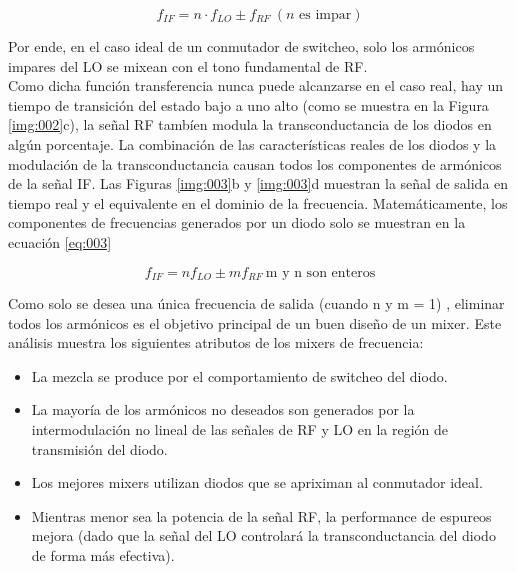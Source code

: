 \documentclass[a4paper,10pt]{article}
\begin{document}
	\begin{equation*}
		f_{IF} = n\cdot f_{LO}\pm f_{RF}~(n\text{ es impar})
	\end{equation*}

	\indent Por ende, en el caso ideal de un conmutador de switcheo, solo los 
	armónicos impares del LO se mixean con el tono fundamental de RF. \\
	\indent Como dicha función transferencia nunca puede alcanzarse en el caso 
	real, hay un tiempo de transición del estado bajo a uno alto (como se 
	muestra en la Figura \ref{img:002}c), la señal RF tambíen modula la 
	transconductancia de los diodos en algún porcentaje. La combinación de las 
	características reales de los diodos y la modulación de la transconductancia
	causan todos los componentes de armónicos de la señal IF. Las Figuras 
	\ref{img:003}b y \ref{img:003}d muestran la señal de salida en tiempo real y
	el equivalente en el dominio de la frecuencia. Matemáticamente, los 
	componentes de frecuencias generados por un diodo solo se muestran en la 
	ecuación \ref{eq:003}

	\begin{equation}\label{eq:003}
 		f_{IF} = n f_{LO}\pm m f_{RF}~\text{m y n son enteros}
	\end{equation}

	\indent Como solo se desea una única frecuencia de salida (cuando n y m = 1)
	, eliminar todos los armónicos es el objetivo principal de un buen diseño 
	de un mixer. Este análisis muestra los siguientes atributos de los mixers de
	frecuencia:

	\begin{itemize}
		\item La mezcla se produce por el comportamiento de switcheo del diodo.
		\item La mayoría de los armónicos no deseados son generados por la 
		intermodulación no lineal de las señales de RF y LO en la región de 
		transmisión del diodo.
		\item Los mejores mixers utilizan diodos que se apriximan al conmutador 
		ideal.
		\item Mientras menor sea la potencia de la señal RF, la performance de 
		espureos mejora (dado que la señal del LO controlará la 
		transconductancia del diodo de forma más efectiva).
	\end{itemize}
\end{document}
